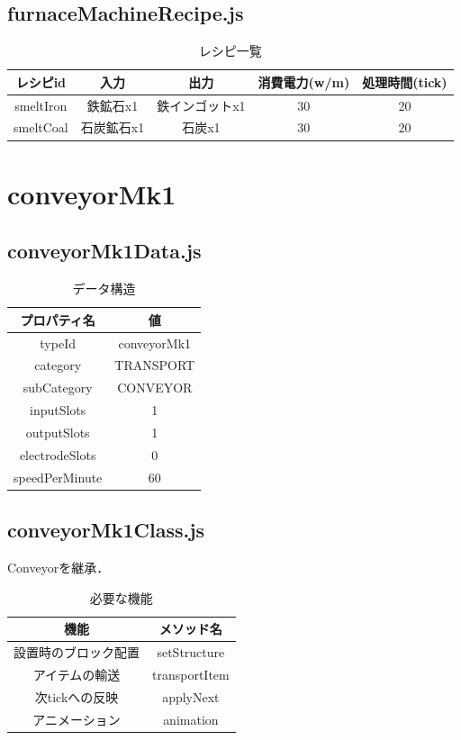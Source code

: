 \documentclass[uplatex,dvipdfmx,report]{jlreq}
\begin{document}
\subsection{furnaceMachineRecipe.js}

\begin{table}[H]
    \centering
    \caption{レシピ一覧}
    \begin{tabular}{ccccc}
        \hline
        レシピid & 入力 & 出力 & 消費電力(w/m) & 処理時間(tick) \\
        \hline
        \hline
        smeltIron & 鉄鉱石x1 & 鉄インゴットx1 & 30 & 20 \\
        smeltCoal & 石炭鉱石x1 & 石炭x1 & 30 & 20 \\
        \hline
    \end{tabular}
\end{table}

\section{conveyorMk1}

\subsection{conveyorMk1Data.js}

\begin{table}[H]
    \centering
    \caption{データ構造}
    \begin{tabular}{cc}
        \hline
        プロパティ名 & 値 \\
        \hline
        \hline
        typeId & conveyorMk1 \\
        category & TRANSPORT \\
        subCategory & CONVEYOR \\
        inputSlots & 1 \\
        outputSlots & 1 \\
        electrodeSlots & 0 \\
        speedPerMinute & 60 \\
        \hline
    \end{tabular}
\end{table}

\subsection{conveyorMk1Class.js}

Conveyorを継承．

\begin{table}[H]
    \centering
    \caption{必要な機能}
    \begin{tabular}{cc}
        \hline
        機能 & メソッド名 \\
        \hline
        \hline
        設置時のブロック配置 & setStructure \\
        アイテムの輸送 & transportItem \\
        次tickへの反映 & applyNext \\
        アニメーション & animation \\
        \hline
    \end{tabular}
\end{table}
\end{document}
